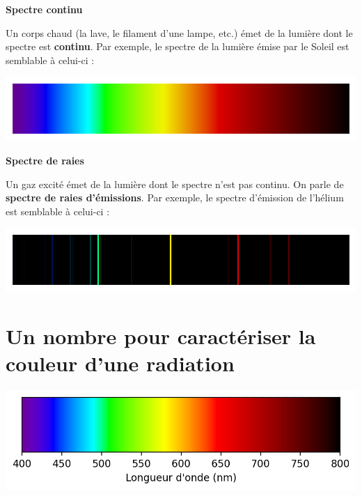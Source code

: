 \documentclass[12pt,a4paper,fleqn]{article}
\begin{document}
\begin{multicols}{2}
\begin{doc}
\textbf{Spectre continu}

Un corps chaud (la lave, le filament d'une lampe, etc.) émet de la lumière dont le spectre est \textbf{continu}.
Par exemple, le spectre de la lumière émise par le Soleil est semblable à celui-ci :

\begin{center}
\includegraphics[width=\linewidth]{images/sun_spectrum_simple.png}
\end{center}
\end{doc}

\begin{doc}
\textbf{Spectre de raies}

Un gaz excité émet de la lumière dont le spectre n'est pas continu.
On parle de \textbf{spectre de raies d'émissions}.
Par exemple, le spectre d'émission de l'hélium est semblable à celui-ci :

\begin{center}
\includegraphics[width=\linewidth]{images/he_spectrum_simple.png}
\end{center}
\end{doc}
\end{multicols}

\section*{Un nombre pour caractériser la \og couleur \fg{} d'une radiation}

\begin{center}
\includegraphics[scale=1]{images/vis_spectrum.png}
\end{center}
\end{document}
